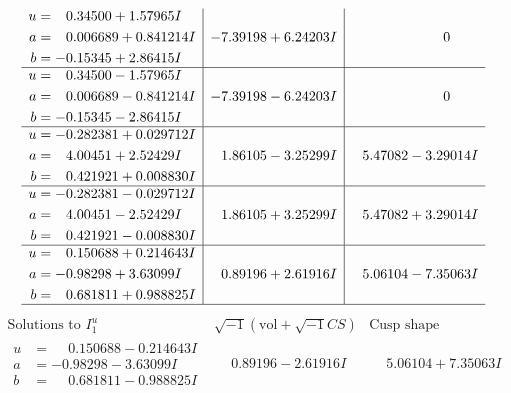 \documentclass[1p]{elsarticle_modified}
\theoremstyle{definition}
\newcommand{\I}{\sqrt{-1}}
\begin{document}
$$\begin{array}{c|c|c}
\begin{aligned}
u &= \phantom{-}0.34500 + 1.57965 I \\
a &= \phantom{-}0.006689 + 0.841214 I \\
b &= -0.15345 + 2.86415 I\end{aligned}
 & -7.39198 + 6.24203 I & \phantom{-0.000000 } 0 \\ \hline\begin{aligned}
u &= \phantom{-}0.34500 - 1.57965 I \\
a &= \phantom{-}0.006689 - 0.841214 I \\
b &= -0.15345 - 2.86415 I\end{aligned}
 & -7.39198 - 6.24203 I & \phantom{-0.000000 } 0 \\ \hline\begin{aligned}
u &= -0.282381 + 0.029712 I \\
a &= \phantom{-}4.00451 + 2.52429 I \\
b &= \phantom{-}0.421921 + 0.008830 I\end{aligned}
 & \phantom{-}1.86105 - 3.25299 I & \phantom{-}5.47082 - 3.29014 I \\ \hline\begin{aligned}
u &= -0.282381 - 0.029712 I \\
a &= \phantom{-}4.00451 - 2.52429 I \\
b &= \phantom{-}0.421921 - 0.008830 I\end{aligned}
 & \phantom{-}1.86105 + 3.25299 I & \phantom{-}5.47082 + 3.29014 I \\ \hline\begin{aligned}
u &= \phantom{-}0.150688 + 0.214643 I \\
a &= -0.98298 + 3.63099 I \\
b &= \phantom{-}0.681811 + 0.988825 I\end{aligned}
 & \phantom{-}0.89196 + 2.61916 I & \phantom{-}5.06104 - 7.35063 I\\
 \hline 
 \end{array}$$\newpage$$\begin{array}{c|c|c}  
\text{Solutions to }I^u_{1}& \I (\text{vol} + \sqrt{-1}CS) & \text{Cusp shape}\\
 \hline 
\begin{aligned}
u &= \phantom{-}0.150688 - 0.214643 I \\
a &= -0.98298 - 3.63099 I \\
b &= \phantom{-}0.681811 - 0.988825 I\end{aligned}
 & \phantom{-}0.89196 - 2.61916 I & \phantom{-}5.06104 + 7.35063 I \\ \hline\begin{aligned}

\end{aligned}
\end{array}$$
\end{document}
